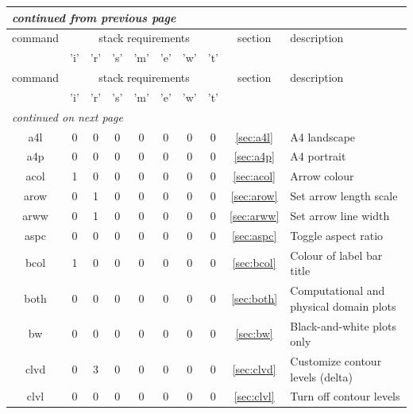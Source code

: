 \documentclass[a4paper,10pt]{report}
\begin{document}
\begin{center}
  \begin{longtable}{|c|c|c|c|c|c|c|c|c|l|}
    \hline
    \multicolumn{10}{|l|}{\small\sl continued from previous page} \\
    \hline command & \multicolumn{7}{|c|}{stack requirements} & section & description \\
    \hline   & 'i' & 'r' & 's' & 'm' & 'e' & 'w' & 't' &   &   \\
    \hline \endhead
    \hline command & \multicolumn{7}{|c|}{stack requirements} & section & description \\
    \hline   & 'i' & 'r' & 's' & 'm' & 'e' & 'w' & 't' &   &   \\
    \hline \endfirsthead
    \hline
    \multicolumn{10}{|l|}{\small\sl continued on next page} \\
    \hline \endfoot
    \endlastfoot
    a4l \index{b2plot, a4l}        & 0 & 0 & 0 & 0 & 0 & 0 & 0 & \ref{sec:a4l}    & A4 landscape \\
    a4p \index{b2plot, a4p}        & 0 & 0 & 0 & 0 & 0 & 0 & 0 & \ref{sec:a4p}    & A4 portrait \\
    acol \index{b2plot, acol}      & 1 & 0 & 0 & 0 & 0 & 0 & 0 & \ref{sec:acol}   & Arrow colour \\
    arow \index{b2plot, arow}      & 0 & 1 & 0 & 0 & 0 & 0 & 0 & \ref{sec:arow}   & Set arrow length scale \\
    arww \index{b2plot, arww}      & 0 & 1 & 0 & 0 & 0 & 0 & 0 & \ref{sec:arww}   & Set arrow line width \\
    aspc \index{b2plot, aspc}      & 0 & 0 & 0 & 0 & 0 & 0 & 0 & \ref{sec:aspc}   & Toggle aspect ratio \\
    bcol \index{b2plot, bcol}      & 1 & 0 & 0 & 0 & 0 & 0 & 0 & \ref{sec:bcol}   & Colour of label bar title \\
    both \index{b2plot, both}      & 0 & 0 & 0 & 0 & 0 & 0 & 0 & \ref{sec:both}   & Computational and physical domain plots \\
    bw \index{b2plot, bw}          & 0 & 0 & 0 & 0 & 0 & 0 & 0 & \ref{sec:bw}     & Black-and-white plots only \\
    clvd \index{b2plot, clvd}      & 0 & 3 & 0 & 0 & 0 & 0 & 0 & \ref{sec:clvd}   & Customize contour levels (delta) \\
    clvl \index{b2plot, clvl}      & 0 & 0 & 0 & 0 & 0 & 0 & 0 & \ref{sec:clvl}   & Turn off contour levels \\

\end{longtable}
\end{center}
\end{document}
